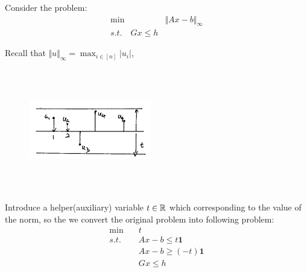


\begin{example}
	Consider the problem:
	\begin{align*}
		\min\quad& \Vert Ax - b\Vert_{\infty}\\
		s.t. \quad Gx \leq h
	\end{align*}
	
	Recall that $\Vert u\Vert_{\infty} = \max_{i\in [n]}|u_i|$,
	\begin{figure}
		\centering
		\includegraphics[width=2.1in,height=2.1in]{figures/ch07/figure1016_2.png}
	\end{figure}
	
	Introduce a helper(auxiliary) variable $t\in \mathbb{R}$ which corresponding to the value of the norm, so the we convert the original problem into following problem:	
	\begin{align*}
		\min \quad &t\\
		s.t. \quad&Ax - b\leq t\textbf{1}\\
		&Ax - b\geq (-t)\textbf{1}\\
		&Gx \leq h
	\end{align*}
\end{example}



